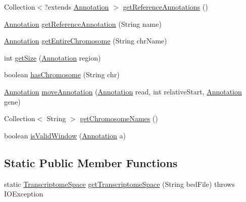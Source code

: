 \begin{DoxyCompactItemize}
\item 
Collection$<$?extends \hyperlink{interfaceumms_1_1core_1_1annotation_1_1_annotation}{Annotation} $>$ \hyperlink{classumms_1_1core_1_1coordinatesystem_1_1_transcriptome_space_a14f2ecdae9339f65f3bb1b94c1fc1778}{get\+Reference\+Annotations} ()
\item 
\hyperlink{interfaceumms_1_1core_1_1annotation_1_1_annotation}{Annotation} \hyperlink{classumms_1_1core_1_1coordinatesystem_1_1_transcriptome_space_a57cde968a85677a101950c8af6691844}{get\+Reference\+Annotation} (String name)
\item 
\hyperlink{interfaceumms_1_1core_1_1annotation_1_1_annotation}{Annotation} \hyperlink{classumms_1_1core_1_1coordinatesystem_1_1_transcriptome_space_a5b234ba584e16b4c9f6302ad41c40984}{get\+Entire\+Chromosome} (String chr\+Name)
\item 
int \hyperlink{classumms_1_1core_1_1coordinatesystem_1_1_transcriptome_space_a0507bd6bd556e74bb734790344b6531e}{get\+Size} (\hyperlink{interfaceumms_1_1core_1_1annotation_1_1_annotation}{Annotation} region)
\item 
boolean \hyperlink{classumms_1_1core_1_1coordinatesystem_1_1_transcriptome_space_a78a947f6e885b70862036cb5e110d452}{has\+Chromosome} (String chr)
\item 
\hyperlink{interfaceumms_1_1core_1_1annotation_1_1_annotation}{Annotation} \hyperlink{classumms_1_1core_1_1coordinatesystem_1_1_transcriptome_space_aab8d4e9081568504dda0d062bebd2fe7}{move\+Annotation} (\hyperlink{interfaceumms_1_1core_1_1annotation_1_1_annotation}{Annotation} read, int relative\+Start, \hyperlink{interfaceumms_1_1core_1_1annotation_1_1_annotation}{Annotation} gene)
\item 
Collection$<$ String $>$ \hyperlink{classumms_1_1core_1_1coordinatesystem_1_1_transcriptome_space_a1605208e15a7edb288bfce529040f314}{get\+Chromosome\+Names} ()
\item 
boolean \hyperlink{classumms_1_1core_1_1coordinatesystem_1_1_transcriptome_space_a28ab0ddf98f75313937219c61a5cff37}{is\+Valid\+Window} (\hyperlink{interfaceumms_1_1core_1_1annotation_1_1_annotation}{Annotation} a)
\end{DoxyCompactItemize}
\subsection*{Static Public Member Functions}
\begin{DoxyCompactItemize}
\item 
static \hyperlink{classumms_1_1core_1_1coordinatesystem_1_1_transcriptome_space}{Transcriptome\+Space} \hyperlink{classumms_1_1core_1_1coordinatesystem_1_1_transcriptome_space_a009b95c213608b804918ed940e13ce2a}{get\+Transcriptome\+Space} (String bed\+File)  throws I\+O\+Exception 
\end{DoxyCompactItemize}

